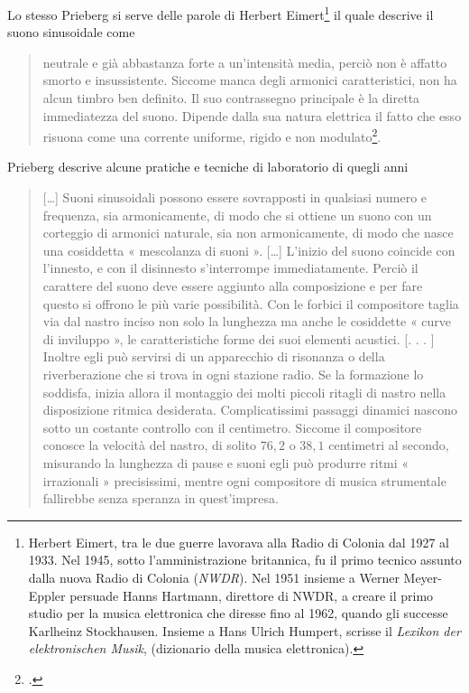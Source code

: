 Lo stesso Prieberg si serve delle parole di Herbert Eimert\footnote{Herbert Eimert, tra le due guerre lavorava alla Radio di Colonia dal 1927 al 1933. Nel 1945, sotto l'amministrazione britannica, fu il primo tecnico assunto dalla nuova Radio di Colonia (\emph{NWDR}). Nel 1951 insieme a Werner Meyer-Eppler persuade Hanns Hartmann, direttore di NWDR, a creare il primo studio per la musica elettronica che diresse fino al 1962, quando gli successe Karlheinz Stockhausen. Insieme a Hans Ulrich Humpert, scrisse il \emph{Lexikon der elektronischen Musik}, (dizionario della musica elettronica).} il quale descrive il suono sinusoidale come 
	\begin{quote}
	neutrale e già abbastanza forte a un’intensità media, perciò non è affatto smorto e insussistente. Siccome manca degli armonici caratteristici, non ha alcun timbro ben definito. Il suo contrassegno principale è la diretta immediatezza del suono. Dipende dalla sua natura elettrica il fatto che esso risuona come una corrente uniforme, rigido e non modulato\footcite[\emph{idem}]{prieberg:mexm}.
	\end{quote}

Prieberg descrive alcune pratiche e tecniche di laboratorio di quegli anni

\begin{quote}	
[\ldots] Suoni sinusoidali possono essere sovrapposti in qualsiasi numero e frequenza, sia armonicamente, di modo che si ottiene un suono con un corteggio di armonici naturale, sia non armonicamente, di modo che nasce una cosiddetta « mescolanza di suoni ». [\ldots] L’inizio del suono coincide con l’innesto, e con il disinnesto s’interrompe immediatamente. Perciò il carattere del suono deve essere aggiunto alla composizione e per fare questo si offrono le più varie possibilità. Con le forbici il compositore taglia via dal nastro inciso non solo la lunghezza ma anche le cosiddette « curve di inviluppo », le caratteristiche forme dei suoi elementi acustici. [. . . ] Inoltre egli può servirsi di un apparecchio di risonanza o della riverberazione che si trova in ogni stazione radio. Se la formazione lo soddisfa, inizia allora il montaggio dei molti piccoli ritagli di nastro nella disposizione ritmica desiderata.
Complicatissimi passaggi dinamici nascono sotto un costante controllo con il centimetro. Siccome il compositore conosce la velocità del nastro, di solito $ 76,2 $ o $ 38,1 $ centimetri al secondo, misurando la lunghezza di pause e suoni egli può produrre ritmi « irrazionali » precisissimi, mentre ogni compositore di musica strumentale fallirebbe senza speranza in quest’impresa.
\end{quote}
	
